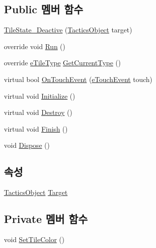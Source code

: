 \subsection*{Public 멤버 함수}
\begin{DoxyCompactItemize}
\item 
\hyperlink{class_tile_1_1_tile_state___deactive_ac54bf790e9656300ad696f6d5bc3cb2b}{Tile\+State\+\_\+\+Deactive} (\hyperlink{class_tactics_object}{Tactics\+Object} target)
\item 
override void \hyperlink{class_tile_1_1_tile_state___deactive_a806c5dbc5eb43903ad41d448f3d25c61}{Run} ()
\item 
override \hyperlink{_tile_8cs_a271bc07be325bca511bcb747e0ff2fda}{e\+Tile\+Type} \hyperlink{class_tile_1_1_tile_state___deactive_a1aed8e0336e11dcb55cb598119c53eda}{Get\+Current\+Type} ()
\item 
virtual bool \hyperlink{class_tile_1_1_tile_state_a8687f7cb0e2c1a436c5ac395f4f6d07a}{On\+Touch\+Event} (\hyperlink{_touch_manager_8cs_ae33e321a424fe84ba8b2fdb81ad40a68}{e\+Touch\+Event} touch)
\item 
virtual void \hyperlink{class_m_c_n_1_1_state_a5be59bc891e64cbbe4322d74a6746908}{Initialize} ()
\item 
virtual void \hyperlink{class_m_c_n_1_1_state_aebf48ef248bbf185d6aae91d9789459e}{Destroy} ()
\item 
virtual void \hyperlink{class_m_c_n_1_1_state_a2492ca731678b8216c02134dddeeb745}{Finish} ()
\item 
void \hyperlink{class_m_c_n_1_1_state_af6df0477e0dead784489688cb2c2093e}{Dispose} ()
\end{DoxyCompactItemize}
\subsection*{속성}
\begin{DoxyCompactItemize}
\item 
\hyperlink{class_tactics_object}{Tactics\+Object} \hyperlink{class_m_c_n_1_1_state_a79a563b32f183c9adc9a96679fc57eb8}{Target}
\end{DoxyCompactItemize}
\subsection*{Private 멤버 함수}
\begin{DoxyCompactItemize}
\item 
void \hyperlink{class_tile_1_1_tile_state___deactive_ac0b9d7d4a64b2c320eeb2679fc6ad459}{Set\+Tile\+Color} ()
\end{DoxyCompactItemize}


